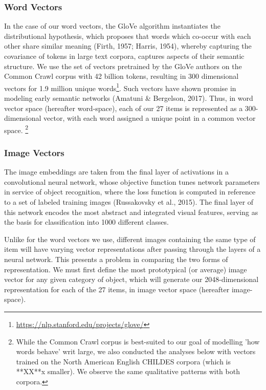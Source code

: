 \documentclass[10pt, letterpaper]{article}
\begin{document}
\subsubsection{Word Vectors}\label{word-vectors}

In the case of our word vectors, the GloVe algorithm instantiates the
distributional hypothesis, which proposes that words which co-occur with
each other share similar meaning (Firth, 1957; Harris, 1954), whereby
capturing the covariance of tokens in large text corpora, captures
aspects of their semantic structure. We use the set of vectors
pretrained by the GloVe authors on the Common Crawl corpus with 42
billion tokens, resulting in 300 dimensional vectors for 1.9 million
unique words\footnote{\url{https://nlp.stanford.edu/projects/glove/}}.
Such vectors have shown promise in modeling early semantic networks
(Amatuni \& Bergelson, 2017). Thus, in word vector space (hereafter
word-space), each of our 27 items is represented as a 300-dimensional
vector, with each word assigned a unique point in a common vector space.
\footnote{While the Common Crawl corpus is best-suited to our goal of modelling 'how words behave' writ large, we also conducted the analyses below with vectors trained on the North American English CHILDES corpora (which is **XX**x smaller). We observe the same qualitative patterns with both corpora.}

\subsubsection{Image Vectors}\label{image-vectors}

The image embeddings are taken from the final layer of activations in a
convolutional neural network, whose objective function tunes network
parameters in service of object recognition, where the loss function is
computed in reference to a set of labeled training images (Russakovsky
et al., 2015). The final layer of this network encodes the most abstract
and integrated visual features, serving as the basis for classification
into 1000 different classes.

Unlike for the word vectors we use, different images containing the same
type of item will have varying vector representations after passing
through the layers of a neural network. This presents a problem in
comparing the two forms of representation. We must first define the most
prototypical (or average) image vector for any given category of object,
which will generate our 2048-dimensional representation for each of the
27 items, in image vector space (hereafter image-space).
\end{document}
